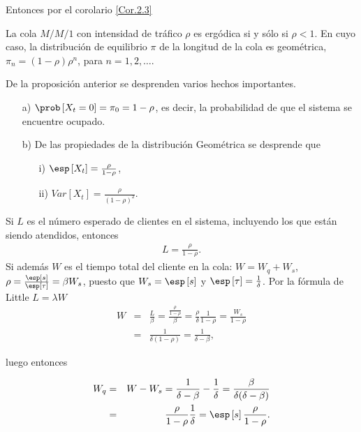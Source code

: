 Entonces por el corolario \ref{Cor.2.3}

\begin{Prop}
La cola $M/M/1$ con intensidad de tr\'afico $\rho$ es erg\'odica si y s\'olo si $\rho<1$. En cuyo caso, la distribuci\'on de equilibrio $\pi$ de la longitud de la cola es geom\'etrica, $\pi_{n}=\left(1-\rho\right)\rho^{n}$, para $n=1,2,\ldots$.
\end{Prop}

De la proposici\'on anterior se desprenden varios hechos importantes.
\begin{itemize}
\item[a) ] $\prob\left[X_{t}=0\right]=\pi_{0}=1-\rho$, es decir, la probabilidad de que el sistema se encuentre ocupado.
\item[b) ] De las propiedades de la distribuci\'on Geom\'etrica se desprende que
\begin{itemize}
\item[i) ] $\esp\left[X_{t}\right]=\frac{\rho}{1-\rho}$,
\item[ii) ] $Var\left[X_{t}\right]=\frac{\rho}{\left(1-\rho\right)^{2}}$.
\end{itemize}
\end{itemize}

Si $L$ es el n\'umero esperado de clientes en el sistema, incluyendo los que est\'an siendo atendidos, entonces
\begin{eqnarray}
L=\frac{\rho}{1-\rho}.
\end{eqnarray}
Si adem\'as $W$ es el tiempo total del cliente en la cola: $W=W_{q}+W_{s}$, $\rho=\frac{\esp\left[s\right]}{\esp\left[\tau\right]}=\beta W_{s}$, puesto que $W_{s}=\esp\left[s\right]$ y $\esp\left[\tau\right]=\frac{1}{\delta}$. Por la f\'ormula de Little $L=\lambda W$
\begin{eqnarray*}
W&=&\frac{L}{\beta}=\frac{\frac{\rho}{1-\rho}}{\beta}=\frac{\rho}{\delta}\frac{1}{1-\rho}=\frac{W_{s}}{1-\rho}\\
&=&\frac{1}{\delta\left(1-\rho\right)}=\frac{1}{\delta-\beta},
\end{eqnarray*}

luego entonces

\begin{eqnarray*}
W_{q}&=&W-W_{s}=\frac{1}{\delta-\beta}-\frac{1}{\delta}=\frac{\beta}{\delta(\delta-\beta)}\\
&=&\frac{\rho}{1-\rho}\frac{1}{\delta}=\esp\left[s\right]\frac{\rho}{1-\rho}.
\end{eqnarray*}

